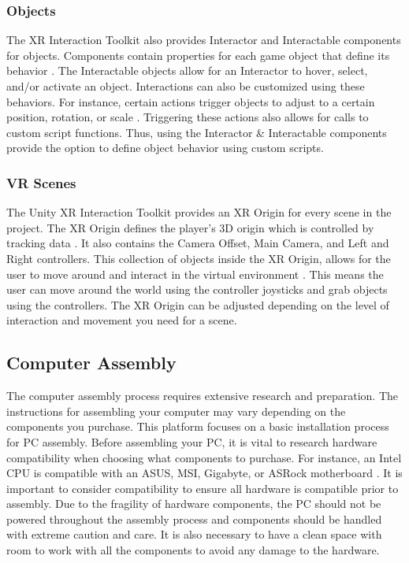 \documentclass[10pt,twocolumn]{article}
\begin{document}
\subsubsection{Objects}

\par The XR Interaction Toolkit also provides Interactor and Interactable components for objects. Components contain properties for each game object that define its behavior \cite{Unity2023IntroductionToComponents}. The Interactable objects allow for an Interactor to hover, select, and/or activate an object. Interactions can also be customized using these behaviors. For instance, certain actions trigger objects to adjust to a certain position, rotation, or scale \cite{Valem2022HowToVR}. Triggering these actions also allows for calls to custom script functions. Thus, using the Interactor \& Interactable components provide the option to define object behavior using custom scripts. 

\subsubsection{VR Scenes}

\par The Unity XR Interaction Toolkit provides an XR Origin for every scene in the project. The XR Origin defines the player’s 3D origin which is controlled by tracking data \cite{Unity2023VRDevelopment}. It also contains the Camera Offset, Main Camera, and Left and Right controllers. This collection of objects inside the XR Origin, allows for the user to move around and interact in the virtual environment \cite{Valem2022HowToVR}. This means the user can move around the world using the controller joysticks and grab objects using the controllers. The XR Origin can be adjusted depending on the level of interaction and movement you need for a scene. 

\subsection{Computer Assembly}

\par The computer assembly process requires extensive research and preparation. The instructions for assembling your computer may vary depending on the components you purchase. This platform focuses on a basic installation process for PC assembly. Before assembling your PC, it is vital to research hardware compatibility when choosing what components to purchase. For instance, an Intel CPU is compatible with an ASUS, MSI, Gigabyte, or ASRock motherboard \cite{Newegg2023IntelMotherboards}. It is important to consider compatibility to ensure all hardware is compatible prior to assembly. Due to the fragility of hardware components, the PC should not be powered throughout the assembly process and components should be handled with extreme caution and care. It is also necessary to have a clean space with room to work with all the components to avoid any damage to the hardware.
\end{document}
